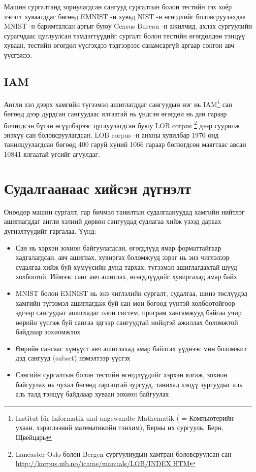 Машин сургалтанд зориулагдсан сангууд сургалтын болон тестийн гэх хоёр хэсэгт хуваагддаг бөгөөд EMNIST -н хувьд NIST -н өгөгдлийг боловсруулахдаа MNIST -н баримталсан аргыг буюу Census Bureau -н ажилчид, ахлах сургуулийн сурагчдаас цуглуулсан тэмдэгтүүдийг сургалт болон тестийн өгөгдөлдөө тэнцүү хуваан, тестийн өгөгдөл үүсгэхдээ тэдгээрээс санамсаргүй аргаар сонгон авч үүсгэжээ.

\subsection{IAM \cite{iam-database}}

Англи хэл дээрх хамгийн түгээмэл ашиглагддаг сангуудын нэг нь IAM\footnote{Institut für Informatik und angewandte Mathematik ( = Компьютерийн ухаан, хэрэглээний математикийн тэнхим), Берны их сургууль, Берн, Щвейцарь} сан бөгөөд дээр дурдсан сангуудаас ялгаатай нь үндсэн өгөгдөл нь дан гараар бичигдсэн бүтэн өгүүлбэрээс цуглуулагдсан буюу LOB corpus \cite{lob-corpus}\footnote{Lancaster-Oslo болон Bergen сургуулиудын хамтран боловсруулсан сан \url{http://korpus.uib.no/icame/manuals/LOB/INDEX.HTM}} дээр суурилж энэхүү сан боловсруулагдсан. LOB corpus -н анхны хувилбар 1970 онд танилцуулагдсан бөгөөд 400 гаруй хүний 1066 гараар бөглөгдсөн маягтаас авсан 10841 ялгаатай үгсийг агуулдаг.

\section{Судалгаанаас хийсэн дүгнэлт}

Өнөөдөр машин сургалт, гар бичмэл танилтын судалгаануудад хамгийн нийтлэг ашиглагддаг англи хэлний дөрвөн сангуудад судлагаа хийж үзээд дараах дүгнэлтүүдийг гаргалаа. Үүнд:

\begin{itemize}
	\item Сан нь хэрхэн зохион байгуулагдсан, өгөгдлүүд ямар форматтайгаар хадгалагдсан, авч ашиглах, хувиргах боломжууд зэрэг нь энэ чиглэлээр судалгаа хийж буй хүмүүсийн дунд тархах, түгээмэл ашиглагдахтай шууд холбоотой. Иймээс санг авч ашиглах, өгөгдлүүдийг хувиргахад амар байх
	\item MNIST болон EMNIST нь энэ чиглэлийн сургалт, судалгаа, шинэ төслүүдэд хамгийн түгээмэл ашиглагдаж буй сан мөн бөгөөд үүнтэй холбоотойгоор эдгээр сангуудыг ашигладаг олон систем, програм хангамжууд байгаа учир өөрийн үүсгэж буй сангаа эдгээр сангуудтай нийцтэй ажиллах боломжтой байдлаар зохиомжлох\label{criteria:mnist-compatible}
	\item Өөрийн сангаас хүмүүст авч ашиглахад амар байлгах үүднээс мөн боломжит дэд сангууд (subset) нэмэлтээр үүсгэх
	\item Сангийн сургалтын болон тестийн өгөгдлүүдийг хэрхэн ялгаж, зохион байгуулах нь чухал бөгөөд гаргацтай зургууд, танихад хэцүү зургуудыг аль аль талд тэнцүү байдлаар хуваан зохион байгуулах
\end{itemize}
